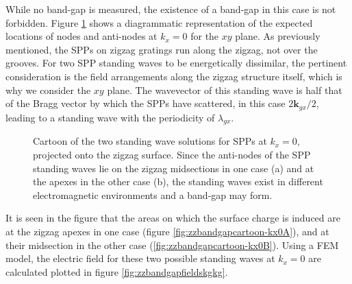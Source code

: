 While no band-gap is measured, the existence of a band-gap in this case is not forbidden. Figure \ref{fig:zzbandgapcartoon-kx0} shows a diagrammatic representation of the expected locations of nodes and anti-nodes at $k_x=0$ for the $xy$ plane. As previously mentioned, the SPPs on zigzag gratings run along the zigzag, not over the grooves. For two SPP standing waves to be energetically dissimilar, the pertinent consideration is the field arrangements along the zigzag structure itself, which is why we consider the $xy$ plane. The wavevector of this standing wave is half that of the Bragg vector by which the SPPs have scattered, in this case $2\mathbf{k}_{gx}/2$, leading to a standing wave with the periodicity of $\lambda_{gx}$. 
\begin{figure}
\begin{center}
\subfigure[]{\label{fig:zzbandgapcartoon-kx0A}}
\subfigure[]{\label{fig:zzbandgapcartoon-kx0B}}		
	\end{center}	
\caption[Cartoon of the two standing wave solutions for SPPs at $k_x=0$, projected onto the zigzag surface.]{Cartoon of the two standing wave solutions for SPPs at $k_x=0$, projected onto the zigzag surface. Since the anti-nodes of the SPP standing waves lie on the zigzag midsections in one case (a) and at the apexes in the other case (b), the standing waves exist in different electromagnetic environments and a band-gap may form. \label{fig:zzbandgapcartoon-kx0}}
\end{figure}
It is seen in the figure that the areas on which the surface charge is induced are at the zigzag apexes in one case (figure \ref{fig:zzbandgapcartoon-kx0A}), and at their midsection in the other case (\ref{fig:zzbandgapcartoon-kx0B}).  Using a FEM model, the electric field for these two possible standing waves at $k_x=0$ are calculated plotted in figure \ref{fig:zzbandgapfieldskgkg}. 

